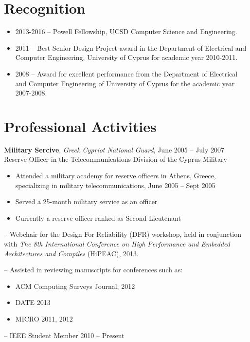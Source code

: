 \documentclass[11pt]{myres} %
\begin{document}
\begin{resume}
\section{Recognition} 
\begin{itemize}
	\item 2013-2016 -- Powell Fellowship, UCSD Computer Science and Engineering.
	\item 2011 -- Best Senior Design Project award in the Department of Electrical and Computer Engineering, University of Cyprus for academic year 2010-2011.
	\item 2008 -- Award for excellent performance from the Department of Electrical and Computer Engineering of University of Cyprus for the academic year 2007-2008.
\end{itemize}
 
\section{Professional Activities} 

\textbf{Military Sercive}, \emph{Greek Cypriot National Guard}, June 2005 -- July 2007\\
Reserve Officer in the Telecommunications Division of the Cyprus Military\\
\begin{itemize}
	\item Attended a military academy for reserve officers in Athens, Greece, specializing in military telecommunications, June 2005 -- Sept 2005
	\item Served a 25-month military service as an officer
	\item Currently a reserve officer ranked as Second Lieutenant
\end{itemize}

-- Webchair for the Design For Reliability (DFR) workshop, held in conjunction with \emph{The 8th International Conference on High Performance and Embedded Architectures and Compiles} (HiPEAC), 2013.

-- Assisted in reviewing manuscripts for conferences such as:
\begin{itemize}
	\item ACM Computing Surveys Journal, 2012
	\item DATE 2013
	\item MICRO 2011, 2012
\end{itemize}

-- IEEE Student Member 2010 -- Present
 

\end{resume}
\end{document}
